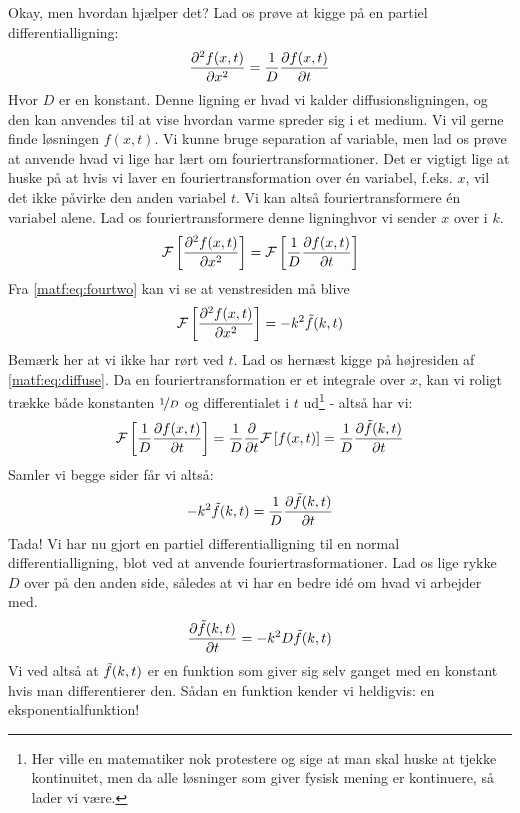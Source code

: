 \documentclass[crop=false, class=memoir]{standalone}
\begin{document}
Okay, men hvordan hjælper det? Lad os prøve at kigge på en partiel differentialligning:
\begin{align}
    \pdv[2]{f(x,t)}{x} = \frac{1}{D}\pdv{f(x,t)}{t}
\end{align}
Hvor $D$ er en konstant. Denne ligning er hvad vi kalder diffusionsligningen, og den kan anvendes til at vise hvordan varme spreder sig i et medium. Vi vil gerne finde løsningen $f(x,t)$. Vi kunne bruge separation af variable, men lad os prøve at anvende hvad vi lige har lært om fouriertransformationer. Det er vigtigt lige at huske på at hvis vi laver en fouriertransformation over én variabel, f.eks. $x$, vil det ikke påvirke den anden variabel $t$. Vi kan altså fouriertransformere én variabel alene. Lad os fouriertransformere denne ligninghvor vi sender $x$ over i $k$.
\begin{align}
    \mathcal{F}\left[ \pdv[2]{f(x,t)}{x} \right] = \mathcal{F}\left[ \frac{1}{D}\pdv{f(x,t)}{t} \right]
    \label{matf:eq:diffuse}
\end{align}
Fra \cref{matf:eq:fourtwo} kan vi se at venstresiden må blive
\begin{align}
    \mathcal{F}\left[ \pdv[2]{f(x,t)}{x} \right] = -k^2 \Tilde{f}(k,t)
\end{align}
Bemærk her at vi ikke har rørt ved $t$. Lad os hernæst kigge på højresiden af \cref{matf:eq:diffuse}. Da en fouriertransformation er et integrale over $x$, kan vi roligt trække både konstanten $\nicefrac{1}{D}$ og differentialet i $t$ ud\footnote{Her ville en matematiker nok protestere og sige at man skal huske at tjekke kontinuitet, men da alle løsninger som giver fysisk mening er kontinuere, så lader vi være.} - altså har vi:
\begin{align}
    \mathcal{F}\left[ \frac{1}{D}\pdv{f(x,t)}{t} \right] = \frac{1}{D}\pdv{}{t}\mathcal{F} \left[ f(x,t) \right] = \frac{1}{D}\pdv{\Tilde{f}(k,t)}{t}
\end{align}
Samler vi begge sider får vi altså:
\begin{align}
    -k^2 \Tilde{f}(k,t) = \frac{1}{D}\pdv{\Tilde{f}(k,t)}{t}
\end{align}
Tada! Vi har nu gjort en partiel differentialligning til en normal differentialligning, blot ved at anvende fouriertrasformationer. Lad os lige rykke $D$ over på den anden side, således at vi har en bedre idé om hvad vi arbejder med. 
\begin{align}
    \pdv{\Tilde{f}(k,t)}{t} = -k^2 D \Tilde{f}(k,t)
\end{align}
Vi ved altså at $\Tilde{f}(k,t)$ er en funktion som giver sig selv ganget med en konstant hvis man differentierer den. Sådan en funktion kender vi heldigvis: en eksponentialfunktion!
\end{document}
